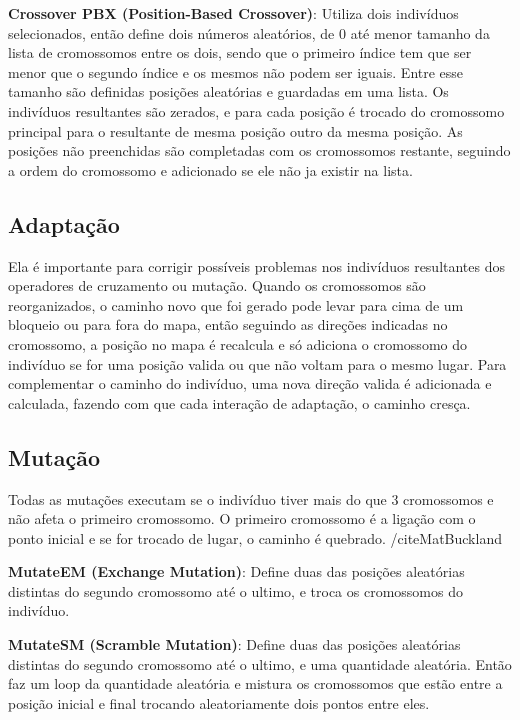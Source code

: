 \textbf{Crossover PBX (Position-Based Crossover)}: Utiliza dois indivíduos selecionados, então define dois números aleatórios, 
de 0 até menor tamanho da lista de cromossomos entre os dois, sendo que o primeiro índice tem que ser menor que o segundo índice e os mesmos não podem ser iguais. 
Entre esse tamanho são definidas posições aleatórias e guardadas em uma lista. Os indivíduos resultantes são zerados, 
e para cada posição é trocado do cromossomo principal para o resultante de mesma posição outro da mesma posição. 
As posições não preenchidas são completadas com os cromossomos restante, seguindo a ordem do cromossomo e adicionado se ele não ja existir na lista.

\subsection{Adaptação}

Ela é importante para corrigir possíveis problemas nos indivíduos resultantes dos operadores de cruzamento ou mutação. Quando os cromossomos são reorganizados, 
o caminho novo que foi gerado pode levar para cima de um bloqueio ou para fora do mapa, então seguindo as direções indicadas no cromossomo, 
a posição no mapa é recalcula e só adiciona o cromossomo do indivíduo se for uma posição valida ou que não voltam para o mesmo lugar.
Para complementar o caminho do indivíduo, uma nova direção valida é adicionada e calculada, fazendo com que cada interação de adaptação, o caminho cresça.

\subsection{Mutação}

Todas as mutações executam se o indivíduo tiver mais do que 3 cromossomos e não afeta o primeiro cromossomo.
O primeiro cromossomo é a ligação com o ponto inicial e se for trocado de lugar, o caminho é quebrado. /cite{MatBuckland}

\textbf{MutateEM (Exchange Mutation)}: Define duas das posições aleatórias distintas do segundo cromossomo até o ultimo, e troca os cromossomos do indivíduo.

\textbf{MutateSM (Scramble Mutation)}: Define duas das posições aleatórias distintas do segundo cromossomo até o ultimo, e uma quantidade aleatória. Então faz um loop da quantidade aleatória e mistura os cromossomos que estão entre a posição inicial e final trocando aleatoriamente dois pontos entre eles.


